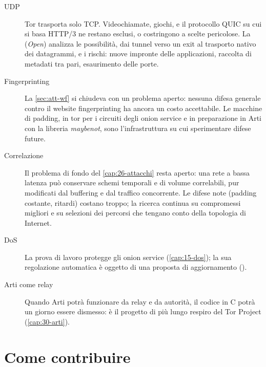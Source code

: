\begin{description}
  \item[UDP] Tor trasporta solo TCP. Videochiamate, giochi, e il protocollo QUIC su cui si basa HTTP/3 ne restano esclusi, o costringono a scelte pericolose. La  (\emph{Open}) analizza le possibilità, dai tunnel verso un exit al trasporto nativo dei datagrammi, e i rischi: nuove impronte delle applicazioni, raccolta di metadati tra pari, esaurimento delle porte.
  \item[Fingerprinting] La \cref{sec:att-wf} si chiudeva con un problema aperto: nessuna difesa generale contro il website fingerprinting ha ancora un costo accettabile. Le macchine di padding, in tor per i circuiti degli onion service e in preparazione in Arti con la libreria \emph{maybenot}, sono l'infrastruttura su cui sperimentare difese future.
  \item[Correlazione] Il problema di fondo del \cref{cap:26-attacchi} resta aperto: una rete a bassa latenza può conservare schemi temporali e di volume correlabili, pur modificati dal buffering e dal traffico concorrente. Le difese note (padding costante, ritardi) costano troppo; la ricerca continua su compromessi migliori e su selezioni dei percorsi che tengano conto della topologia di Internet.
  \item[DoS] La prova di lavoro protegge gli onion service (\cref{cap:15-dos}); la sua regolazione automatica è oggetto di una proposta di aggiornamento ().
  \item[Arti come relay] Quando Arti potrà funzionare da relay e da autorità, il codice in C potrà un giorno essere dismesso: è il progetto di più lungo respiro del Tor Project (\cref{cap:30-arti}).
\end{description}

\section{Come contribuire}\label{sec:fut-contribuire}

